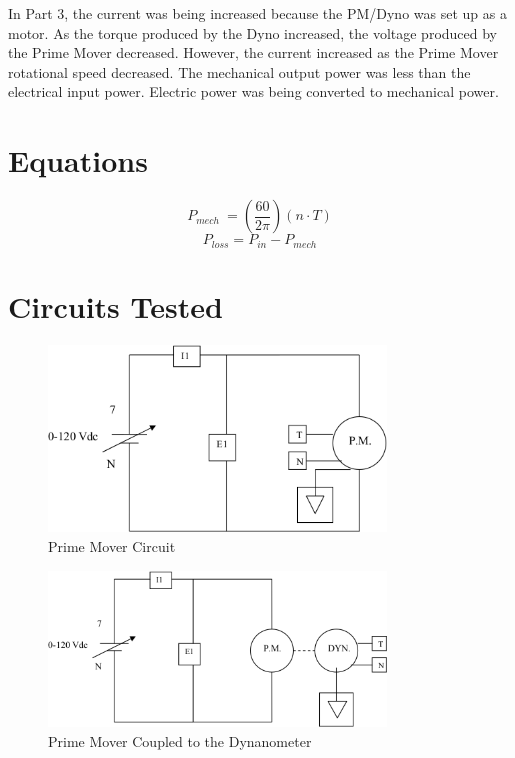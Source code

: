 \documentclass{article}
\begin{document}
In Part 3, the current was being increased because the PM/Dyno was set up as a
motor. As the torque produced by the Dyno increased, the voltage produced by
the Prime Mover decreased. However, the current increased as the Prime Mover
rotational speed decreased. The mechanical output power was less than the
electrical input power.  Electric power was being converted to mechanical
power.

\section*{Equations}

\[P_{mech}\ = \left( \frac{60}{2\pi} \right) (n \cdot T)\]
\[P_{loss} = P_{in} - P_{mech}\]

\section*{Circuits Tested}

\begin{figure}[H]
  \centering
  \includegraphics[width=0.8\textwidth]{img/circuit_01}
  \caption{Prime Mover Circuit}
  \label{fig:circuit_01}
\end{figure}

\begin{figure}[H]
  \centering
  \includegraphics[width=0.8\textwidth]{img/circuit_02}
  \caption{Prime Mover Coupled to the Dynanometer}
  \label{fig:circuit_02}
\end{figure}
\end{document}
